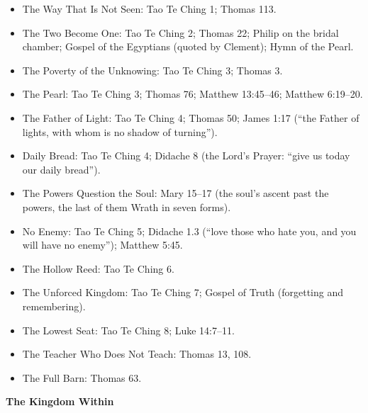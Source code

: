 \documentclass[10pt, openright]{book}
\providecommand{\tightlist}{\setlength{\itemsep}{0pt}\setlength{\parskip}{0pt}}
\begin{document}
\begin{itemize}
\tightlist
\item
  The Way That Is Not Seen: Tao Te Ching 1; Thomas 113.
\item
  The Two Become One: Tao Te Ching 2; Thomas 22; Philip on the bridal
  chamber; Gospel of the Egyptians (quoted by Clement); Hymn of the
  Pearl.
\item
  The Poverty of the Unknowing: Tao Te Ching 3; Thomas 3.
\item
  The Pearl: Tao Te Ching 3; Thomas 76; Matthew 13:45--46; Matthew
  6:19--20.
\item
  The Father of Light: Tao Te Ching 4; Thomas 50; James 1:17 (``the
  Father of lights, with whom is no shadow of turning'').
\item
  Daily Bread: Tao Te Ching 4; Didache 8 (the Lord's Prayer: ``give us
  today our daily bread'').
\item
  The Powers Question the Soul: Mary 15--17 (the soul's ascent past the
  powers, the last of them Wrath in seven forms).
\item
  No Enemy: Tao Te Ching 5; Didache 1.3 (``love those who hate you, and
  you will have no enemy''); Matthew 5:45.
\item
  The Hollow Reed: Tao Te Ching 6.
\item
  The Unforced Kingdom: Tao Te Ching 7; Gospel of Truth (forgetting and
  remembering).
\item
  The Lowest Seat: Tao Te Ching 8; Luke 14:7--11.
\item
  The Teacher Who Does Not Teach: Thomas 13, 108.
\item
  The Full Barn: Thomas 63.
\end{itemize}

\textbf{The Kingdom Within}
\end{document}
